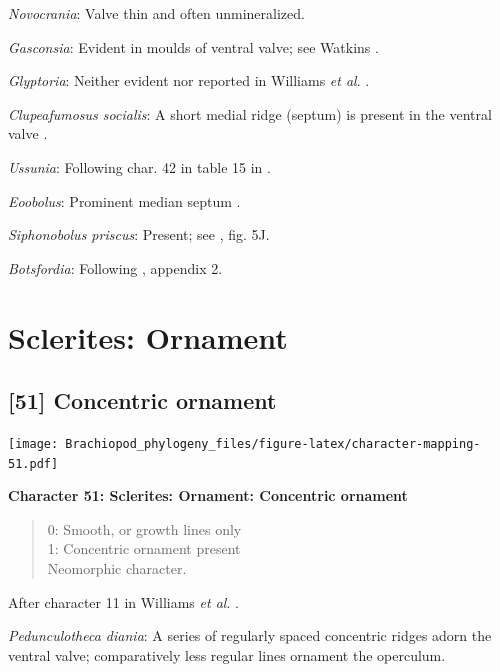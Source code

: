 \documentclass[]{book}
\theoremstyle{definition}
\theoremstyle{definition}
\theoremstyle{definition}
\theoremstyle{remark}
\begin{document}
\emph{Novocrania}: Valve thin and often unmineralized.

\emph{Gasconsia}: Evident in moulds of ventral valve; see Watkins
\citeyearpar{Watkins2002Newrecord}.

\emph{Glyptoria}: Neither evident nor reported in Williams \emph{et al}.
\citeyearpar{Williams2000BrachiopodaLinguliformea}.

\emph{Clupeafumosus socialis}: A short medial ridge (septum) is present
in the ventral valve \citep{Topper2013Reappraisalof}.

\emph{Ussunia}: Following char. 42 in table 15 in
\citet{Williams2000BrachiopodaLinguliformea}.

\emph{Eoobolus}: Prominent median septum \citep[fig. 4d, e
in][]{Balthasar2009Thebrachiopod}.

\emph{Siphonobolus priscus}: Present; see
\citet{Popov2009Earlyontogeny}, fig. 5J.

\emph{Botsfordia}: Following \citet{Williams1998Thediversity}, appendix
2.

\hypertarget{sclerites-ornament}{%
\section{Sclerites: Ornament}\label{sclerites-ornament}}

\hypertarget{concentric-ornament}{%
\subsection*{{[}51{]} Concentric ornament}\label{concentric-ornament}}

\texttt{[image: Brachiopod\_phylogeny\_files/figure-latex/character-mapping-51.pdf]}

\textbf{Character 51: Sclerites: Ornament: Concentric ornament}

\begin{quote}
0: Smooth, or growth lines only\\
1: Concentric ornament present\\
Neomorphic character.
\end{quote}

After character 11 in Williams \emph{et al}.
\citeyearpar{Williams1998Thediversity}.

\emph{Pedunculotheca diania}: A series of regularly spaced concentric
ridges adorn the ventral valve; comparatively less regular lines
ornament the operculum.
\end{document}
